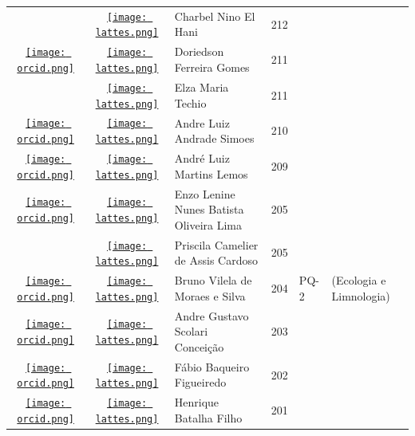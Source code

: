 \documentclass[12pt,brazil]{article}\usepackage[]{graphicx}\usepackage[]{xcolor}
\begin{document}
\begin{longtable}{cclrll}
 & \href{http://lattes.cnpq.br/8022297490892415}{\texttt{[image: lattes.png]}} & Charbel Nino El Hani & 212 &  &  \\

\href{https://orcid.org/0000-0002-1569-8101}{\texttt{[image: orcid.png]}} & \href{http://lattes.cnpq.br/8362416389366966}{\texttt{[image: lattes.png]}} & Doriedson Ferreira Gomes & 211 &  &  \\

 & \href{http://lattes.cnpq.br/5421304500367255}{\texttt{[image: lattes.png]}} & Elza Maria Techio & 211 &  &  \\

\href{https://orcid.org/0000-0001-7784-3290}{\texttt{[image: orcid.png]}} & \href{http://lattes.cnpq.br/4744339230025916}{\texttt{[image: lattes.png]}} & Andre Luiz Andrade Simoes & 210 &  &  \\

\href{https://orcid.org/0000-0001-9291-6494}{\texttt{[image: orcid.png]}} & \href{http://lattes.cnpq.br/5586679333125539}{\texttt{[image: lattes.png]}} & André Luiz Martins Lemos & 209 &  &  \\

\href{https://orcid.org/0000-0001-5280-4252}{\texttt{[image: orcid.png]}} & \href{http://lattes.cnpq.br/5912441748094486}{\texttt{[image: lattes.png]}} & Enzo Lenine Nunes Batista Oliveira Lima & 205 &  &  \\

 & \href{http://lattes.cnpq.br/5822288200392555}{\texttt{[image: lattes.png]}} & Priscila Camelier de Assis Cardoso & 205 &  &  \\

\href{https://orcid.org/0000-0003-4072-0558}{\texttt{[image: orcid.png]}} & \href{http://lattes.cnpq.br/5535116365389028}{\texttt{[image: lattes.png]}} & Bruno Vilela de Moraes e Silva & 204 & PQ-2 & (Ecologia e Limnologia) \\

\href{https://orcid.org/0000-0001-8124-6253}{\texttt{[image: orcid.png]}} & \href{http://lattes.cnpq.br/6840685961007897}{\texttt{[image: lattes.png]}} & Andre Gustavo Scolari Conceição & 203 &  &  \\

\href{https://orcid.org/0000-0002-6418-8036}{\texttt{[image: orcid.png]}} & \href{http://lattes.cnpq.br/1806117156597780}{\texttt{[image: lattes.png]}} & Fábio Baqueiro Figueiredo & 202 &  &  \\

\href{https://orcid.org/0000-0001-7191-2814}{\texttt{[image: orcid.png]}} & \href{http://lattes.cnpq.br/1967904095420961}{\texttt{[image: lattes.png]}} & Henrique Batalha Filho & 201 &  &  \\


\end{longtable}
\end{document}
